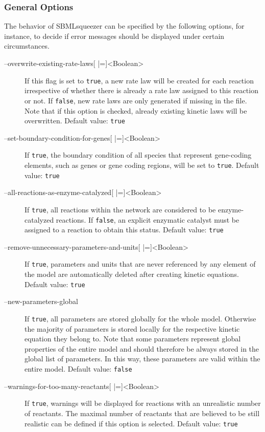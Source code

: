 \subsubsection{General Options}
The behavior of SBMLsqueezer can be specified by the following options, for
instance, to decide if error messages should be displayed under
certain circumstances.
\begin{description}
\item[--overwrite-existing-rate-laws{[} |={]}<Boolean>]
  If this flag is set to \texttt{true}, a new rate law will be created for
  each reaction irrespective of whether there is already a rate
  law assigned to this reaction or not. If \texttt{false}, new
  rate laws are only generated if missing in the \SBML file. Note
  that if this option is checked, already existing kinetic laws
  will be overwritten.
  Default value: \texttt{true}

\item[--set-boundary-condition-for-genes{[} |={]}<Boolean>]
  If \texttt{true}, the boundary condition of all species that
  represent gene-coding elements, such as genes or gene coding
  regions, will be set to \texttt{true}.
  Default value: \texttt{true}

\item[--all-reactions-as-enzyme-catalyzed{[} |={]}<Boolean>]
  If \texttt{true}, all reactions within the network are considered to be
  enzyme-catalyzed reactions. If \texttt{false}, an explicit
  enzymatic catalyst must be assigned to a reaction to obtain
  this status.
  Default value: \texttt{true}

\item[--remove-unnecessary-parameters-and-units{[} |={]}<Boolean>]
  If \texttt{true}, parameters and units that are never referenced
  by any element of the model are automatically deleted after
  creating kinetic equations.
  Default value: \texttt{true}

\item[--new-parameters-global]
  If \texttt{true}, all parameters are stored globally for the
  whole model. Otherwise the majority of parameters is stored
  locally for the respective kinetic equation they belong to.
  Note that some parameters represent global properties of the
  entire model and should therefore be always stored in the global
  list of parameters. In this way, these parameters are valid within
  the entire model.
  Default value: \texttt{false}

\item[--warnings-for-too-many-reactants{[} |={]}<Boolean>]
  If \texttt{true}, warnings will be displayed for reactions with
  an unrealistic number of reactants. The maximal number of reactants
  that are believed to be still realistic can be defined if this
  option is selected.
  Default value: \texttt{true}


\end{description}
